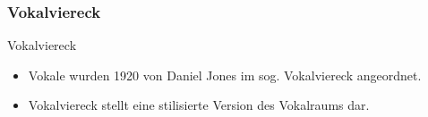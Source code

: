 \subsubsection{Vokalviereck}

\begin{frame}{Vokalviereck}

	\begin{itemize}
		\item Vokale wurden 1920 von Daniel Jones im sog. Vokalviereck angeordnet.
		\item Vokalviereck stellt eine stilisierte Version des Vokalraums dar.
	\end{itemize}


\end{frame}
